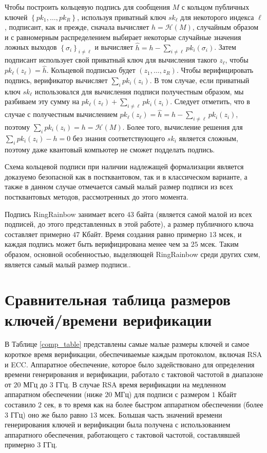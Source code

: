 \documentclass{mrl}
\begin{document}
Чтобы построить кольцевую подпись для сообщения $M$ с кольцом публичных ключей $\left\{pk_1, \ldots, pk_R\right\}$, используя приватный ключ $sk_\ell$ для некоторого индекса $\ell$, подписант, как и прежде, сначала вычисляет $h = \mathcal{H}(M)$, случайным образом и с равномерным распределением выбирает некоторые случайные значения ложных выходов $\left\{\sigma_i\right\}_{i \neq \ell}$ и вычисляет $\widehat{h} = h - \sum_{i \neq \ell} pk_i(\sigma_i)$. Затем подписант использует свой приватный ключ для вычисления такого $z_\ell$, чтобы $pk_\ell(z_\ell) = \widehat{h}$. Кольцевой подписью будет $(z_1, \ldots, z_R)$. Чтобы верифицировать подпись, верификатор вычисляет $\sum_i pk_i(z_i)$. В том случае, если приватный ключ $sk_\ell$ использовался для вычисления подписи получестным образом, мы разбиваем эту сумму на $pk_\ell(z_\ell) + \sum_{i \neq \ell} pk_i(z_i)$. Следует отметить, что в случае с получестным вычислением $pk_\ell(z_\ell) = \widehat{h} = h - \sum_{i \neq \ell} pk_i(z_i)$, поэтому $\sum_i pk_i(z_i) = h = \mathcal{H}(M)$. Более того, вычисление решения для $\sum_i pk_i(z_i) - h = 0$ без знания соответствующего $sk_i$ является сложным, поэтому даже квантовый компьютер не сможет подделать подпись.

Схема кольцевой подписи при наличии надлежащей формализации является доказуемо безопасной как в постквантовом, так и в классическом варианте, а также в данном случае отмечается самый малый размер подписи из всех постквантовых методов, рассмотренных до этого момента. 

Подпись RingRainbow занимает всего $43$ байта (является самой малой из всех подписей, до этого представленных в этой работе), а размер публичного ключа составляет примерно $47$ Кбайт. Время создания равно примерно $13$ мсек, и каждая подпись может быть верифицирована менее чем за $25$ мсек. Таким образом, основной особенностью, выделяющей RingRainbow среди других схем, является самый малый размер подписи.. 

\section{Сравнительная таблица размеров ключей/времени верификации}

В Таблице \ref{comp_table} представлены самые малые размеры ключей и самое короткое время верификации, обеспечиваемые каждым протоколом, включая RSA и ECC. Аппаратное обеспечение, которое было задействовано для определения времени генерирования и верификации, работало с тактовой частотой в диапазоне от $20$ МГц до $3$ ГГц. В случае RSA время верификации на медленном аппаратном обеспечении (ниже $20$ МГц) для подписи с размером $1$ Кбайт составило $2$ сек, в то время как на более быстром аппаратном обеспечении (более $3$ ГГц) оно же было равно $1$3 мсек. Большая часть значений времени генерирования ключей и верификации была получена с использованием аппаратного обеспечения, работающего с тактовой частотой, составлявшей примерно $3$ ГГц.
\end{document}
